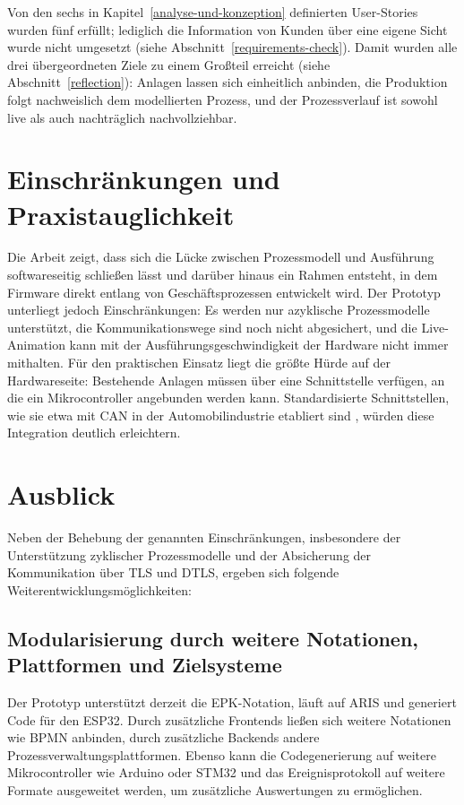 \noindent Von den sechs in Kapitel~\ref{analyse-und-konzeption} definierten User-Stories 
wurden fünf erfüllt; lediglich die Information von Kunden über eine eigene Sicht wurde 
nicht umgesetzt (siehe Abschnitt~\ref{requirements-check}). Damit wurden alle drei 
übergeordneten Ziele zu einem Großteil erreicht (siehe Abschnitt~\ref{reflection}): Anlagen 
lassen sich einheitlich anbinden, die Produktion folgt nachweislich dem modellierten 
Prozess, und der Prozessverlauf ist sowohl live als auch nachträglich nachvollziehbar.

\section{Einschränkungen und Praxistauglichkeit}

Die Arbeit zeigt, dass sich die Lücke zwischen Prozessmodell und Ausführung softwareseitig 
schließen lässt und darüber hinaus ein Rahmen entsteht, in dem Firmware direkt entlang von 
Geschäftsprozessen entwickelt wird. Der Prototyp unterliegt jedoch Einschränkungen: Es 
werden nur azyklische Prozessmodelle unterstützt, die Kommunikationswege sind noch nicht 
abgesichert, und die Live-Animation kann mit der Ausführungsgeschwindigkeit der Hardware 
nicht immer mithalten. Für den praktischen Einsatz liegt die größte Hürde auf der 
Hardwareseite: Bestehende Anlagen müssen über eine Schnittstelle verfügen, an die ein 
Mikrocontroller angebunden werden kann. Standardisierte Schnittstellen, wie sie etwa mit 
CAN in der Automobilindustrie etabliert sind \cite{noauthor_road_2024} 
\cite{hristu-varsakelis_vehicle_2005}, würden diese Integration deutlich erleichtern.

\section{Ausblick}

Neben der Behebung der genannten Einschränkungen, insbesondere der Unterstützung zyklischer 
Prozessmodelle und der Absicherung der Kommunikation über TLS und DTLS, ergeben sich 
folgende Weiterentwicklungsmöglichkeiten:

\subsection{Modularisierung durch weitere Notationen, Plattformen und Zielsysteme}

Der Prototyp unterstützt derzeit die EPK-Notation, läuft auf ARIS und generiert Code für 
den ESP32. Durch zusätzliche Frontends ließen sich weitere Notationen wie BPMN anbinden, 
durch zusätzliche Backends andere Prozessverwaltungsplattformen. Ebenso kann die 
Codegenerierung auf weitere Mikrocontroller wie Arduino oder STM32 und das Ereignisprotokoll 
auf weitere Formate ausgeweitet werden, um zusätzliche Auswertungen zu ermöglichen.

